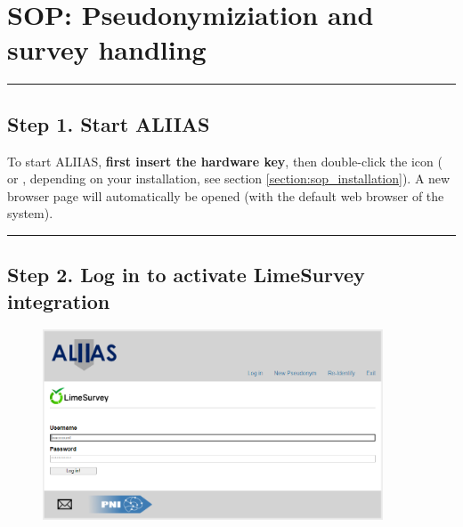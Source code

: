 \pagebreak
\section{SOP: Pseudonymiziation and survey handling}
\label{section:sop_aliias}

\par\noindent\rule{\textwidth\color{pniblue}}{0.4pt}
\subsection*{Step 1. Start ALIIAS}

To start ALIIAS, \textbf{first insert the hardware key}, then double-click the  icon ( or , depending on your installation, see section \ref{section:sop_installation}). A new browser page will automatically be opened (with the default web browser of the system).

\small\setlength\fboxsep{5pt}\setlength\fboxrule{1pt}

\large

\par\noindent\rule{\textwidth\color{pniblue}}{0.4pt}
\subsection*{Step 2. Log in to activate LimeSurvey integration}

\begin{figure}[H]
\includegraphics[width=0.9\textwidth]{docs/fig/01_login.PNG}
\end{figure}

